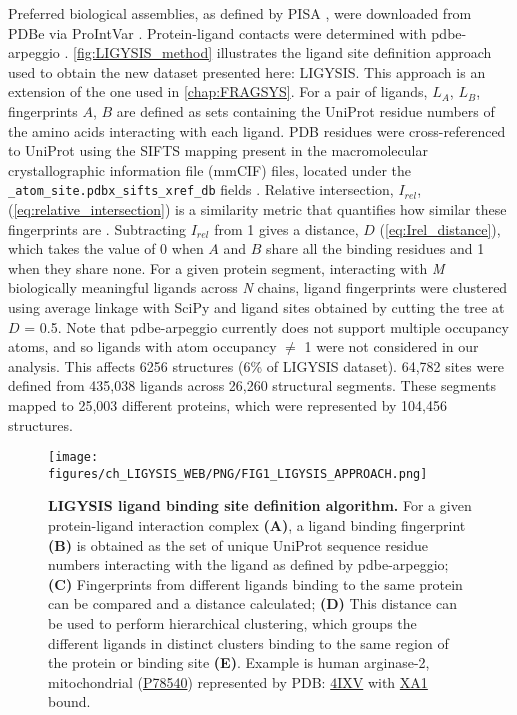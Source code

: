 Preferred biological assemblies, as defined by PISA \cite{KRISSINEL_2007_PISA}, were downloaded from PDBe via ProIntVar \cite{MACGOWAN_2020_DRSASP}. Protein-ligand contacts were determined with pdbe-arpeggio \cite{JUBB_2017_ARPEGGIO}. \autoref{fig:LIGYSIS_method} illustrates the ligand site definition approach used to obtain the new dataset presented here: LIGYSIS. This approach is an extension of the one used in \autoref{chap:FRAGSYS}. For a pair of ligands, $L_A$, $L_B$, fingerprints $A$, $B$ are defined as sets containing the UniProt residue numbers of the amino acids interacting with each ligand. PDB residues were cross-referenced to UniProt using the SIFTS mapping present in the macromolecular crystallographic information file (mmCIF) files, located under the \texttt{\_atom\_site.pdbx\_si\discretionary{-}{}{}fts\_xref\_db} fields \cite{VELANKAR_2012_SIFTS, DANA_2018_SIFTS}. Relative intersection, $I_{rel}$, (\autoref{eq:relative_intersection}) is a similarity metric that quantifies how similar these fingerprints are \cite{UTGES_2024_FRAGSYS}. Subtracting $I_{rel}$ from 1 gives a distance, $D$ (\autoref{eq:Irel_distance}), which takes the value of 0 when $A$ and $B$ share all the binding residues and 1 when they share none. For a given protein segment, interacting with \textit{M} biologically meaningful ligands across \textit{N} chains, ligand fingerprints were clustered using average linkage with SciPy \cite{VIRTANEN_2020_SCIPY} and ligand sites obtained by cutting the tree at $D$ = 0.5. Note that pdbe-arpeggio currently does not support multiple occupancy atoms, and so ligands with atom occupancy $\neq$ 1 were not considered in our analysis. This affects 6256 structures (6\% of LIGYSIS dataset). 64,782 sites were defined from 435,038 ligands across 26,260 structural segments. These segments mapped to 25,003 different proteins, which were represented by 104,456 structures.

\begin{figure}[htb!]
    \centering
    \texttt{[image: figures/ch\_LIGYSIS\_WEB/PNG/FIG1\_LIGYSIS\_APPROACH.png]}
    \caption[LIGYSIS ligand binding site definition algorithm]{\textbf{LIGYSIS ligand binding site definition algorithm.} For a given protein-ligand interaction complex \textbf{(A)}, a ligand binding fingerprint \textbf{(B)} is obtained as the set of unique UniProt sequence residue numbers interacting with the ligand as defined by pdbe-arpeggio; \textbf{(C)} Fingerprints from different ligands binding to the same protein can be compared and a distance calculated; \textbf{(D)} This distance can be used to perform hierarchical clustering, which groups the different ligands in distinct clusters binding to the same region of the protein or binding site \textbf{(E)}. Example is human arginase-2, mitochondrial (\href{https://www.uniprot.org/uniprotkb/P78540/entry}{P78540}) represented by PDB: \href{https://www.ebi.ac.uk/pdbe/entry/pdb/4ixv}{4IXV} \cite{GOLEBIOWSKI_2013_ARGINASE} with \href{https://www.ebi.ac.uk/pdbe-srv/pdbechem/chemicalCompound/show/XA1}{XA1} bound.}
    \label{fig:LIGYSIS_method}
\end{figure}

